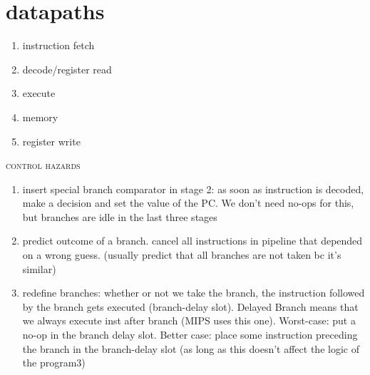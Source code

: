 \documentclass{article}
\begin{document}
\section{datapaths} %
\label{sec:datapahts}
\begin{enumerate}
	\item instruction fetch
	\item decode/register read
	\item execute
	\item memory
	\item register write
\end{enumerate}
\begin{center}\textsc{control hazards}\end{center} 
\begin{enumerate}
	\item insert special branch comparator in stage 2: as soon as instruction is decoded, make a decision and set the value of the PC. We don't need no-ops for this, but branches are idle in the last three stages
	\item predict outcome of a branch. cancel all instructions in pipeline that depended on a wrong guess. (usually predict that all branches are not taken bc it's similar)
	\item redefine branches: whether or not we take the branch, the instruction followed by the branch gets executed (branch-delay slot). Delayed Branch means that we always execute inst after branch (MIPS uses this one). Worst-case: put a no-op in the branch delay slot. Better case: place some instruction preceding the branch in the branch-delay slot (as long as this doesn't affect the logic of the program3)
\end{enumerate}
\end{document}
